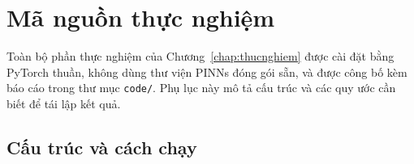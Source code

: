 \appendix

\chapter{Mã nguồn thực nghiệm}
\label{app:code}

Toàn bộ phần thực nghiệm của Chương~\ref{chap:thucnghiem} được cài đặt bằng
PyTorch thuần, không dùng thư viện PINNs đóng gói sẵn, và được công bố kèm báo
cáo trong thư mục \texttt{code/}. Phụ lục này mô tả cấu trúc và các quy ước cần
biết để tái lập kết quả.

\section{Cấu trúc và cách chạy}

